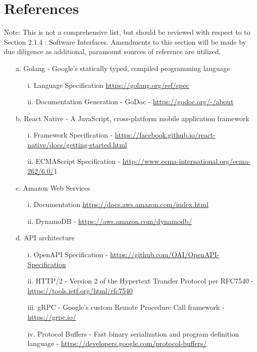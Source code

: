 \documentclass{scrreprt}
\begin{document}
\section{References}
Note: This is not a comprehensive list, but should be reviewed with respect to to Section 2.1.4 : Software Interfaces. Amendments to this section will be made by due diligence as additional, paramount sources of reference are utilized.
\begin{enumerate}
\item[a.] Golang - Google's statically typed, compiled programming language
	\begin{itemize}
		\item[i.] Language Specification \url{https://golang.org/ref/spec}
		\item[ii.] Documentation Generation - GoDoc - \url{https://godoc.org/-/about}
	\end{itemize}
\item[b.] React Native - A JavaScript, cross-platform mobile application framework 
	\begin{itemize}
		\item[i.] Framework Specification - \url{https://facebook.github.io/react-native/docs/getting-started.html}
		\item[ii.] ECMAScript Specification - \url{http://www.ecma-international.org/ecma-262/6.0/}1
	\end{itemize}
\item[c.] Amazon Web Services
	\begin{itemize}
		\item[i.] Documentation \url{https://docs.aws.amazon.com/index.html}
		\item[ii.] DynamoDB - \url{https://aws.amazon.com/dynamodb/}
	\end{itemize}
\item[d.] API architecture
	\begin{itemize}
		\item[i.] OpenAPI Specification - \url{https://github.com/OAI/OpenAPI-Specification}
		\item[ii.] HTTP/2 - Version 2 of the Hypertext Transfer Protocol per RFC7540 - \url{https://tools.ietf.org/html/rfc7540}
		\item[iii.] gRPC - Google's custom Remote Procedure Call framework - \url{https://grpc.io/}
		\item[iv.] Protocol Buffers - Fast binary serialization and program definition language - \url{https://developers.google.com/protocol-buffers/}
	\end{itemize}
\end{enumerate}
\end{document}
